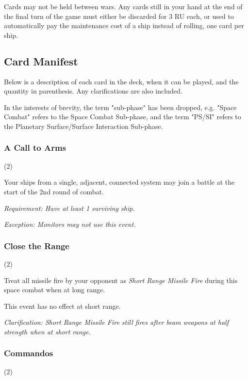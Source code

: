Cards may not be held between wars. Any cards still in your hand at the end of the final turn of the game must either be discarded for 3 RU each, or used to automatically pay the maintenance cost of a ship instead of rolling, one card per ship.

\subsection{Card Manifest}

Below is a description of each card in the deck, when it can be played, and the quantity in parenthesis. Any clarifications are also included.

In the interests of brevity, the term "sub-phase" has been dropped, e.g. "Space Combat" refers to the Space Combat Sub-phase, and the term "PS/SI" refers to the Planetary Surface/Surface Interaction Sub-phase.

\subsubsection{A Call to Arms} (2)


Your ships from a single, adjacent, connected system may join a battle at the start of the 2nd round of combat.

\textit{Requirement: Have at least 1 surviving ship.}

\textit{Exception: Monitors may not use this event.}

\subsubsection{Close the Range} (2)


Treat all missile fire by your opponent as \textit{Short Range Missile Fire} during this space combat when at long range.

This event has no effect at short range.

\textit{Clarification: Short Range Missile Fire still fires after beam weapons at half strength when at short range.}

\subsubsection{Commandos} (2)


